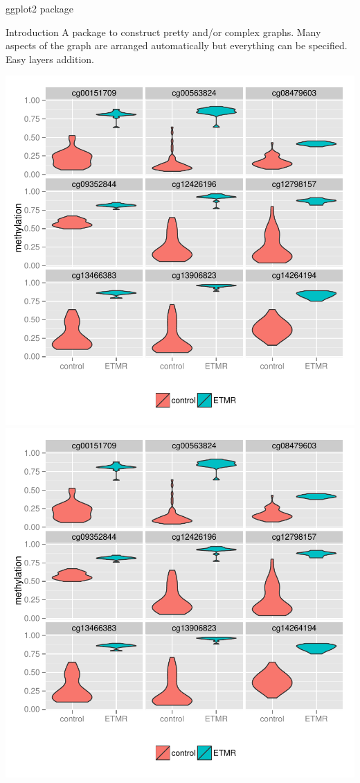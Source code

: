 \documentclass[10pt]{beamer}
\begin{document}
\begin{frame}{{\sf ggplot2} package}
  \begin{block}{Introduction}
    A package to construct pretty and/or complex graphs. Many aspects of the graph are arranged automatically but everything can be specified. Easy layers addition.
  \end{block}

  \includegraphics[height=.6\textheight]{../imgs/example-ggplot2.pdf}
  \includegraphics[height=.6\textheight,page=2]{../imgs/example-ggplot2.pdf}

\end{frame}
\end{document}
